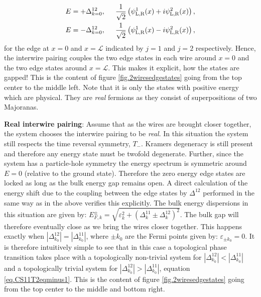 \begin{align}
E &= +\Delta^{12}_{k=0}, \hspace{0.5cm} \frac{1}{\sqrt{2}}\left( \psi^1_{\text{L,R}}(x) + i\psi^2_{\text{L,R}}(x) \right), \nonumber \\
E &= -\Delta^{12}_{k=0}, \hspace{0.5cm} \frac{1}{\sqrt{2}}\left( \psi^1_{\text{L,R}}(x) - i\psi^2_{\text{L,R}}(x) \right),
\label{eq.perturbededgestates}
\end{align}
for the edge at $x = 0$ and $x = \mathcal{L}$ indicated by $j = 1$ and $j = 2$ respectively. Hence, the interwire pairing couples the two edge states in each wire around $x = 0$ and the two edge states around $x = \mathcal{L}$. This makes it explicit, how the states are gapped! This is the content of figure \ref{fig.2wiresedgestates} going from the top center to the middle left. Note that it is only the states with positive energy which are physical. They are \textit{real} fermions as they consist of superpositions of two Majoranas.  

\textbf{Real interwire pairing}: Assume that as the wires are brought closer together, the system chooses the interwire pairing to be \textit{real}. In this situation the system still respects the time reversal symmetry, $T_-$. Kramers degeneracy is still present and therefore any energy state must be twofold degenerate. Further, since the system has a particle-hole symmetry the energy spectrum is symmetric around $E = 0$ (relative to the ground state). Therefore the zero energy edge states are locked as long as the bulk energy gap remains open. A direct calculation of the energy shift due to the coupling between the edge states by $\Delta^{12}$ performed in the same way as in the above verifies this explicitly. The bulk energy dispersions in this situation are given by: $E^{\pm}_{F,k} = \sqrt{\varepsilon^2_k + (\Delta^{11}_k \pm \Delta^{12}_k)^2}$. The bulk gap will therefore eventually close as we bring the wires closer together. This happens exactly when $|\Delta^{12}_{k_0}| = |\Delta^{11}_{k_0}|$, where $\pm k_0$ are the Fermi points given by: $\varepsilon_{\pm k_0} = 0$. It is therefore intuitively simple to see that in this case a topological phase transition takes place with a topologically non-trivial system for $|\Delta^{12}_{k_0}| < |\Delta^{11}_{k_0}|$ and a topologically trivial system for $|\Delta^{12}_{k_0}| > |\Delta^{11}_{k_0}|$, equation \eqref{eq.CS11T2eqminus1}. This is the content of figure \ref{fig.2wiresedgestates} going from the top center to the middle and bottom right. 

